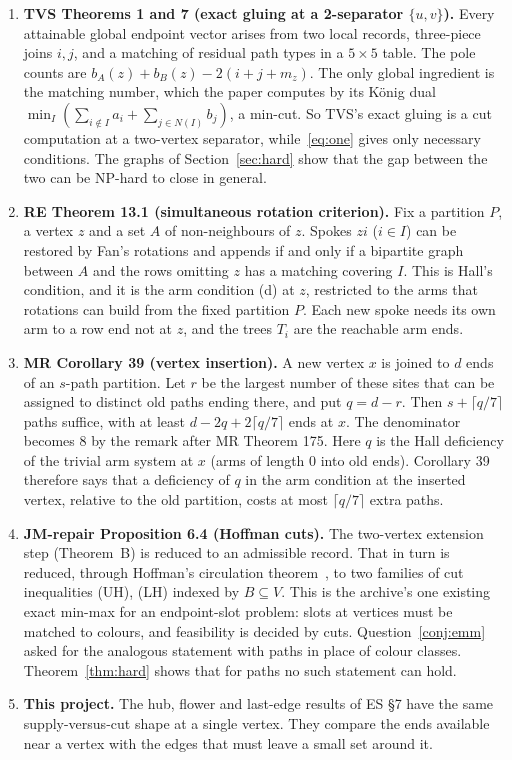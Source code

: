 \documentclass[11pt]{amsart}
\theoremstyle{definition}
\begin{document}
\begin{enumerate}
\item \textbf{TVS Theorems 1 and 7 (exact gluing at a 2-separator $\{u,v\}$).} Every attainable global
endpoint vector arises from two local records, three-piece joins $i,j$, and a matching of residual
path types in a $5\times5$ table. The pole counts are $b_A(z)+b_B(z)-2(i+j+m_z)$. The only global
ingredient is the matching number, which the paper computes by its K\"onig dual
$\min_I(\sum_{i\notin I}a_i+\sum_{j\in N(I)}b_j)$, a min-cut. So TVS's exact gluing is a cut
computation at a two-vertex separator, while~\eqref{eq:one} gives only necessary conditions. The
graphs of Section~\ref{sec:hard} show that the gap between the two can be NP-hard to close in
general.

\item \textbf{RE Theorem 13.1 (simultaneous rotation criterion).} Fix a partition $P$, a vertex $z$
and a set $A$ of non-neighbours of $z$. Spokes $zi$ ($i\in I$) can be restored by Fan's rotations and
appends if and only if a bipartite graph between $A$ and the rows omitting $z$ has a matching covering
$I$. This is Hall's condition, and it is the arm condition (d) at $z$, restricted to the arms that
rotations can build from the fixed partition $P$. Each new spoke needs its own arm to a row end not
at $z$, and the trees $T_i$ are the reachable arm ends.

\item \textbf{MR Corollary 39 (vertex insertion).} A new vertex $x$ is joined to $d$ ends of an
$s$-path partition. Let $r$ be the largest number of these sites that can be assigned to distinct old
paths ending there, and put $q=d-r$. Then $s+\lceil q/7\rceil$ paths suffice, with at least
$d-2q+2\lceil q/7\rceil$ ends at $x$. The denominator becomes $8$ by the remark after MR Theorem 175.
Here $q$ is the Hall deficiency of the trivial arm system at $x$ (arms of length $0$ into old ends).
Corollary 39 therefore says that a deficiency of $q$ in the arm condition at the inserted vertex,
relative to the old partition, costs at most $\lceil q/7\rceil$ extra paths.

\item \textbf{JM-repair Proposition 6.4 (Hoffman cuts).} The two-vertex extension step (Theorem~B) is
reduced to an admissible record. That in turn is reduced, through Hoffman's circulation
theorem~\cite{Hof60}, to two families of cut inequalities (UH), (LH) indexed by $B\subseteq V$. This is
the archive's one existing exact min-max for an endpoint-slot problem: slots at vertices must be
matched to colours, and feasibility is decided by cuts. Question~\ref{conj:emm} asked for the analogous
statement with paths in place of colour classes. Theorem~\ref{thm:hard} shows that for paths no such
statement can hold.

\item \textbf{This project.} The hub, flower and last-edge results of ES \S7 have the same
supply-versus-cut shape at a single vertex. They compare the ends available near a vertex with the
edges that must leave a small set around it.
\end{enumerate}
\end{document}
